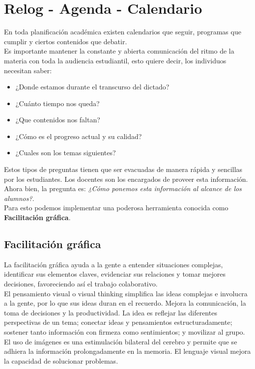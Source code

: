 \section{Relog - Agenda - Calendario}
En toda planificaci\'on acad\'emica existen calendarios que seguir, programas que cumplir y ciertos contenidos que debatir.\\
Es importante mantener la constante y abierta comunicaci\'on del ritmo de la materia con toda la audiencia estudiantil, esto quiere decir, los individuos 
necesitan saber:
\begin{itemize}
 \item ¿Donde estamos durante el transcurso del dictado?
 \item ¿Cu\'anto tiempo nos queda?
 \item ¿Que contenidos nos faltan?
 \item ¿C\'omo es el progreso actual y su calidad?
 \item ¿Cuales son los temas siguientes?
\end{itemize}
Estos tipos de preguntas tienen que ser evacuadas de manera r\'apida y sencillas por los estudiantes. Los docentes son los encargados de proveer esta
informaci\'on. Ahora bien, la pregunta es: \textit{¿C\'omo ponemos esta informaci\'on al alcance de los alumnos?}.\\
Para esto podemos implementar una poderosa herramienta conocida como \textbf{Facilitaci\'on gr\'afica}.
\subsection{Facilitaci\'on gr\'afica}
La facilitaci\'on gr\'afica ayuda a la gente a entender situaciones complejas, identificar sus elementos claves, evidenciar sus relaciones y tomar mejores 
decisiones, favoreciendo as\'i el trabajo colaborativo.\cite{fg}\\
El pensamiento visual o visual thinking simplifica las ideas complejas e involucra a la gente, por lo que sus ideas duran en el recuerdo. Mejora la 
comunicaci\'on, la toma de decisiones y la productividad. La idea es reflejar las diferentes perspectivas de un tema; conectar ideas y pensamientos 
estructuradamente; sostener tanto informaci\'on con firmeza como sentimientos; y movilizar al grupo. El uso de im\'agenes es una estimulaci\'on bilateral del 
cerebro y permite que se adhiera la informaci\'on prolongadamente en la memoria. El lenguaje visual mejora la capacidad de solucionar problemas.
